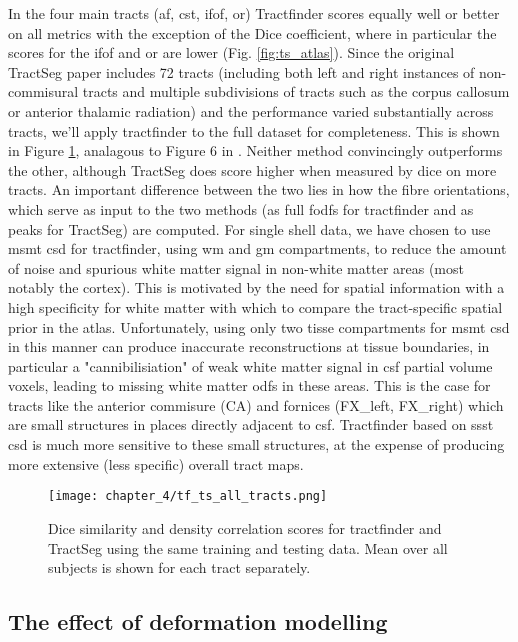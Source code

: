 In the four main tracts (\gls{af}, \gls{cst}, \gls{ifof}, \gls{or}) Tractfinder scores equally well or better on all metrics with the exception of the Dice coefficient, where in particular the scores for the \gls{ifof} and \gls{or} are lower (Fig. \ref{fig:ts_atlas}).
Since the original TractSeg paper includes 72 tracts (including both left and right instances of non-commisural tracts and multiple subdivisions of tracts such as the corpus callosum or anterior thalamic radiation) and the performance varied substantially across tracts, we'll apply tractfinder to the full dataset for completeness.
This is shown in Figure \ref{fig:ts_all_tracts}, analagous to Figure 6 in \textcite{Wasserthal2018}.
Neither method convincingly outperforms the other, although TractSeg does score higher when measured by \gls{dice} on more tracts.
An important difference between the two lies in how the fibre orientations, which serve as input to the two methods (as full \glspl{fodf} for tractfinder and as peaks for TractSeg) are computed.
For single shell data, we have chosen to use \gls{msmt} \gls{csd} for tractfinder, using \gls{wm} and \gls{gm} compartments, to reduce the amount of noise and spurious white matter signal in non-white matter areas (most notably the cortex).
This is motivated by the need for spatial information with a high specificity for white matter with which to compare the tract-specific spatial prior in the atlas.
Unfortunately, using only two tisse compartments for \gls{msmt} \gls{csd} in this manner can produce inaccurate reconstructions at tissue boundaries, in particular a "cannibilisiation" of weak white matter signal in \gls{csf} partial volume voxels, leading to missing white matter \glspl{odf} in these areas.
This is the case for tracts like the anterior commisure (CA) and fornices (FX\_left, FX\_right) which are small structures in places directly adjacent to \gls{csf}.
Tractfinder based on \gls{ssst} \gls{csd} is much more sensitive to these small structures, at the expense of producing more extensive (less specific) overall tract maps.

\begin{figure}[h!]
  \centering
  \texttt{[image: chapter\_4/tf\_ts\_all\_tracts.png]}
  \caption{ Dice similarity and density correlation scores for tractfinder and TractSeg using the same training and testing data. Mean over all subjects is shown for each tract separately.}
  \label{fig:ts_all_tracts}
\end{figure}


\subsection{The effect of deformation modelling}
\label{sec:btcd}

